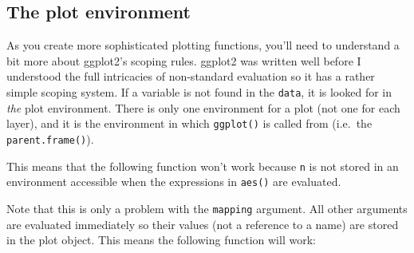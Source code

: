 \subsection{The plot environment}

As you create more sophisticated plotting functions, you'll need to
understand a bit more about ggplot2's scoping rules. ggplot2 was written
well before I understood the full intricacies of non-standard evaluation
so it has a rather simple scoping system. If a variable is not found in
the \texttt{data}, it is looked for in \emph{the} plot environment.
There is only one environment for a plot (not one for each layer), and
it is the environment in which \texttt{ggplot()} is called from
(i.e.~the \texttt{parent.frame()}). 

This means that the following function won't work because \texttt{n} is
not stored in an environment accessible when the expressions in
\texttt{aes()} are evaluated.

\begin{Shaded}
\begin{Highlighting}[]
\StringTok{ }
  \StringTok{ }
  \NormalTok{(}\StringTok{ }
\NormalTok{\}}
\StringTok{ }\NormalTok{(} \NormalTok{:}\NormalTok{, } \NormalTok{:}\NormalTok{)}
\StringTok{ }\NormalTok{()}
\end{Highlighting}
\end{Shaded}

Note that this is only a problem with the \texttt{mapping} argument. All
other arguments are evaluated immediately so their values (not a
reference to a name) are stored in the plot object. This means the
following function will work:

\begin{Shaded}
\begin{Highlighting}[]
\StringTok{ }
  \NormalTok{(} 
\NormalTok{\}}
\StringTok{ }\NormalTok{()}
\end{Highlighting}
\end{Shaded}

